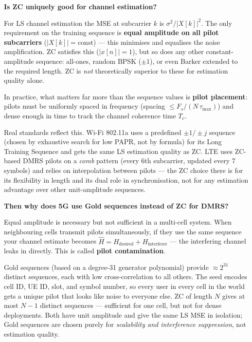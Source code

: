 \documentclass[11pt,a4paper]{article}
\begin{document}
\begin{curiositybox}
\textbf{Is ZC uniquely good for channel estimation?}

For LS channel estimation the MSE at subcarrier $k$ is
$\sigma^2/|X[k]|^2$.  The only requirement on the training sequence is
\textbf{equal amplitude on all pilot subcarriers} ($|X[k]| = \text{const}$)
--- this minimises and equalises the noise amplification.
ZC satisfies this ($|x[n]|=1$), but so does any other constant-amplitude
sequence: all-ones, random BPSK ($\pm 1$), or even Barker extended to the
required length.  ZC is \emph{not} theoretically superior to these for
estimation quality alone.

In practice, what matters far more than the sequence values is
\textbf{pilot placement}: pilots must be uniformly spaced in frequency
(spacing $\leq F_s/(N\,\tau_{\max})$) and dense enough in time to track
the channel coherence time $T_c$.

Real standards reflect this.  Wi-Fi 802.11a uses a predefined $\pm1/\pm j$
sequence (chosen by exhaustive search for low PAPR, not by formula) for its
Long Training Sequence and gets the same LS estimation quality as ZC.
LTE uses ZC-based DMRS pilots on a \emph{comb} pattern (every 6th
subcarrier, updated every 7 symbols) and relies on interpolation between
pilots --- the ZC choice there is for its flexibility in length and its
dual role in synchronisation, not for any estimation advantage over other
unit-amplitude sequences.

\medskip
\textbf{Then why does 5G use Gold sequences instead of ZC for DMRS?}

Equal amplitude is necessary but not sufficient in a multi-cell system.
When neighbouring cells transmit pilots simultaneously, if they use the
same sequence your channel estimate becomes
$\hat{H} = H_{\text{desired}} + H_{\text{interferer}}$
--- the interfering channel leaks in directly.  This is called
\textbf{pilot contamination}.

Gold sequences (based on a degree-31 generator polynomial) provide
$\approx 2^{31}$ distinct sequences, each with low cross-correlation to
all others.  The seed encodes cell ID, UE ID, slot, and symbol number,
so every user in every cell in the world gets a unique pilot that looks
like noise to everyone else.  ZC of length $N$ gives at most $N-1$
distinct sequences --- sufficient for one cell, but not for dense
deployments.  Both have unit amplitude and give the same LS MSE in
isolation; Gold sequences are chosen purely for \emph{scalability and
interference suppression}, not estimation quality.
\end{curiositybox}
\end{document}
